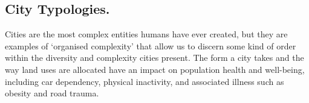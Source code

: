 \documentclass{nature}
\begin{document}





\subsection{City Typologies.}\label{sec:introduction2}
Cities are the most complex entities humans have ever created, but they are examples of `organised complexity' that allow us to discern some kind of order within the diversity and complexity cities present\cite{Kropf2014}. The form a city takes and the way land uses are allocated have an impact on population health and well-being, including car dependency, physical inactivity, and associated illness such as obesity and road trauma\cite{Giles-corti2016, Kleinert2016, Goenka2016,Zapata-Diomedi2017, Heesch2014, Daley2011, Cepeda2016, MingWen2008, Norman2006, Thompson2018b}. 
\end{document}
